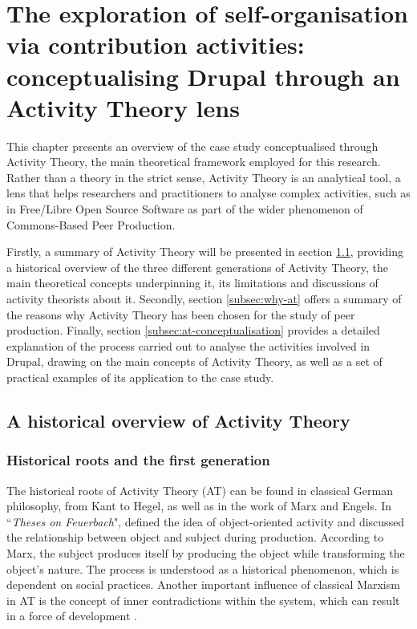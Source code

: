 \chapter{The exploration of self-organisation via contribution activities: conceptualising Drupal through an Activity Theory lens}
\label{sec:theoretical-frameworks}

This chapter presents an overview of the case study conceptualised through Activity Theory, the main theoretical framework employed for this research. Rather than a theory in the strict sense, Activity Theory is an analytical tool, a lens that helps researchers and practitioners to analyse complex activities, such as in Free\slash Libre Open Source Software as part of the wider phenomenon of Commons-Based Peer Production.

Firstly, a summary of Activity Theory will be presented in section \ref{subsec:at}, providing a historical overview of the three different generations of Activity Theory, the main theoretical concepts underpinning it, its limitations and discussions of activity theorists about it. Secondly, section \ref{subsec:why-at} offers a summary of the reasons why Activity Theory has been chosen for the study of peer production. Finally, section \ref{subsec:at-conceptualisation} provides a detailed explanation of the process carried out to analyse the activities involved in Drupal, drawing on the main concepts of Activity Theory, as well as a set of practical examples of its application to the case study.

\section{A historical overview of Activity Theory}
\label{subsec:at}

\subsection{Historical roots and the first generation}

The historical roots of Activity Theory (AT) can be found in classical German philosophy, from Kant to Hegel, as well as in the work of Marx and Engels. In ``\textit{Theses on Feuerbach}", \textcite[143-45]{marx1845theses} defined the idea of object-oriented activity and discussed the relationship between object and subject during production. According to Marx, the subject produces itself by producing the object while transforming the object's nature. The process is understood as a historical phenomenon, which is dependent on social practices. Another important influence of classical Marxism in AT is the concept of inner contradictions within the system, which can result in a force of development \parencite{hegel1861lectures}.

